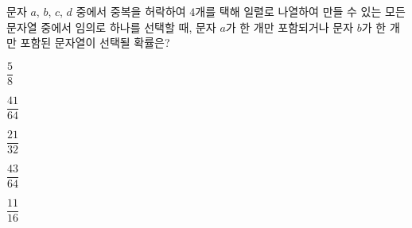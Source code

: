 문자 $a$, $b$, $c$, $d$ 중에서 중복을 허락하여 $4$개를 택해 일렬로 나열하여 만들 수 있는 모든 문자열 중에서 임의로 하나를 선택할 때, 문자 $a$가 한 개만 포함되거나 문자 $b$가 한 개만 포함된 문자열이 선택될 확률은?
\begin{choices32}{\rule[-3ex]{0pt}{8ex}$\dfrac{5}{8}$}{\rule[-3ex]{0pt}{8ex}$\dfrac{41}{64}$}{\rule[-3ex]{0pt}{8ex}$\dfrac{21}{32}$}{\rule[-3ex]{0pt}{8ex}$\dfrac{43}{64}$}{\rule[-3ex]{0pt}{8ex}$\dfrac{11}{16}$}\end{choices32}

